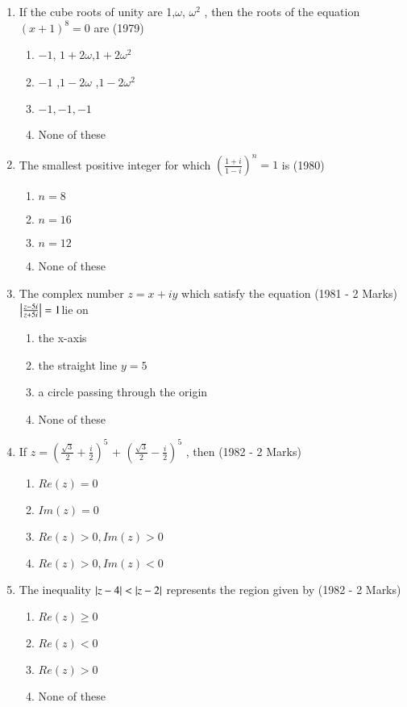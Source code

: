 \documentclass[journal,12pt,twocolumn]{IEEEtran}
\theoremstyle{remark}
\begin{document}
\begin{enumerate}
    

\item If the cube roots of unity are 1,$\omega $, $\omega^2$ , then the roots of the equation $(x+1)^8 = 0$ are                     \hfill(1979)
\begin{enumerate}
\item $-1$, $1+2\omega$,$1+2\omega^2$
\item $-1$ ,$1-2\omega$ ,$1-2\omega^2$
\item $ -1 , -1 ,-1 $ 
\item None of these\\
\end{enumerate}
\item  The smallest positive integer for which
    $(\frac{1+i}{1-i})^n = 1$ is  \hfill(1980)    
\begin{enumerate}
\item  $n=8$
\item  $n=16$
\item  $n=12$
\item None of these\\ 
\end{enumerate}
\item The complex number $z= x+iy$ which satisfy the equation \hfill(1981 - 2 Marks)\\
     $\left\vert\frac{z-5i}{z+5i}\right\vert = 1 $lie on 
\begin{enumerate}
\item  the x-axis
\item  the straight line $y=5$
\item  a circle passing through the origin 
\item  None of these\\
 \end{enumerate}
\item  If $z=(\frac{\sqrt{3}}{2} + \frac{i}{2})^5$ + $(\frac{\sqrt{3}}{2} - \frac{i}{2})^5$ , then \hfill(1982 - 2 Marks)
\begin{enumerate}
\item $Re(z)=0$
\item $Im(z)=0$
\item $Re(z)>0, Im(z)>0$
\item $Re(z)>0,  Im(z)<0$\\
\end{enumerate}
\item The inequality $\left\vert z-4\right\vert<\left\vert z-2\right\vert$ represents the region given by \hfill(1982 - 2 Marks)
\begin{enumerate}
\item $Re(z)\ge0$
\item $Re(z)<0$ 
\item $Re(z)>0$ 
\item None of these
\end{enumerate}
\end{enumerate}
\end{document}
